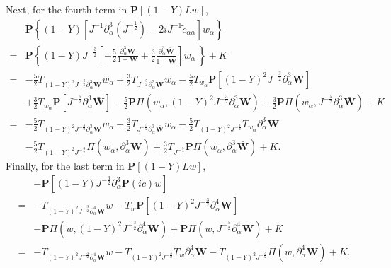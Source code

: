 \documentclass[10pt]{amsart}
\theoremstyle{remark}
\theoremstyle{definition}
\numberwithin{equation}{section}
\newcommand{\p}{\partial}
\newcommand{\al}{\alpha}
\newcommand{\f}{\frac}
\newcommand{\nP}{{\mathbf P}}
\begin{document}
Next, for the fourth term  in $\nP[(1-Y)Lw]$,
\begin{equation*}
\begin{split}
&\nP \left\{(1-Y)[J^{-1}\p_{\al}^3(J^{-\f12})-2iJ^{-1}\tilde{c}_{\al\al}]w_\alpha \right\}\\
=&\nP \left\{(1-Y)J^{-\f32}\left[-\f52\f{\p^3_{\al}\mathbf{W}}{1+\mathbf{W}}+\f32\f{\p^3_{\al}\bar{\mathbf{W}}}{1+\bar{\mathbf{W}}}\right]w_{\al}\, \right\}+K\\
=&-\f52T_{(1-Y)^2J^{-\f32}\p^3_{\al}\mathbf{W}}w_{\al}+\f32T_{J^{-\f52}\p^3_{\al}\bar{\mathbf{W}}}w_{\al} -\f52T_{w_{\al}} \nP \left[(1-Y)^2J^{-\f32}\p^3_{\al}\mathbf{W}\right]\\
&+\f32T_{w_{\al}}\nP \left[J^{-\f52}\p^3_{\al}\bar{\mathbf{W}}\right]-\f52\nP\Pi(w_{\al},(1-Y)^2J^{-\f32}\p^3_{\al}\mathbf{W})+\f32\nP\Pi(w_{\al},J^{-\f52}\p^3_{\al}\bar{\mathbf{W}})+K\, \\
=&-\f52T_{(1-Y)^2J^{-\f32}\p^3_{\al}\mathbf{W}}w_{\al}+\f32T_{J^{-\f52}\p^3_{\al}\bar{\mathbf{W}}}w_{\al} -\f52 T_{(1-Y)^2J^{-\f32}}T_{w_{\al}} \p^3_{\al}\mathbf{W}\\
&-\f52 T_{(1-Y)^2J^{-\f32}}\Pi(w_{\al},\p^3_{\al}\mathbf{W})+\f32T_{J^{-\f52}}\nP\Pi(w_{\al},\p^3_{\al}\bar{\mathbf{W}}) + K.
\end{split}
\end{equation*}
Finally, for the last term  in $\nP[(1-Y)Lw]$,
\begin{equation*}
\begin{split}
&-\nP \left[(1-Y)J^{-\f32}\p_\al^3\nP(i\tilde{c})w \right]\\
=&-T_{(1-Y)^2J^{-\f32}\p^4_{\al}\mathbf{W}}w-T_{w}\nP[(1-Y)^2J^{-\f32}\p^4_{\al}\mathbf{W}]\\
&-\nP\Pi \left(w,(1-Y)^2J^{-\f32}\p^4_{\al}\mathbf{W}\right)+\nP\Pi(w,J^{-\f52}\p^4_{\al}\bar{\mathbf{W}})+K\,\\
=&-T_{(1-Y)^2J^{-\f32}\p^4_{\al}\mathbf{W}}w -T_{(1-Y)^2J^{-\f32}}T_{w}\p^4_{\al}\mathbf{W} -T_{(1-Y)^2J^{-\f32}}\Pi \left(w,\p^4_{\al}\mathbf{W}\right)+K.
\end{split}
\end{equation*}
\end{document}
